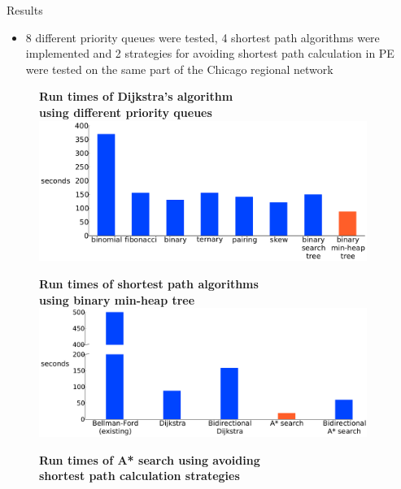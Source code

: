 \documentclass[final]{beamer}
\begin{document}
\begin{frame}{ }
\begin{columns}[t]
\begin{column}{.4\linewidth}
    \end{column}
    \begin{column}{.26\linewidth}
        \begin{block}{Results}
            \begin{itemize}
                \itemsep.4em
                \item 8 different priority queues were tested, 4 shortest path algorithms were implemented and 2 strategies for avoiding shortest path calculation in PE were tested on the same part of the Chicago regional network
            \end{itemize}
            \begin{figure}
                \centering
                {\bfseries \qquad Run times of Dijkstra's algorithm\\ \qquad using different priority queues}
                \includegraphics[width=\linewidth]{img/pq_runtime}
            \end{figure}
            \begin{figure}
                \centering
                {\bfseries \qquad Run times of shortest path algorithms\\ using binary min-heap tree}
                \includegraphics[width=\linewidth]{img/runtime}
            \end{figure}
            \begin{figure}
                \centering
                {\bfseries \qquad Run times of A* search using avoiding\\ \qquad shortest path calculation strategies}

\end{figure}
\end{block}
\end{column}
\end{columns}
\end{frame}
\end{document}
